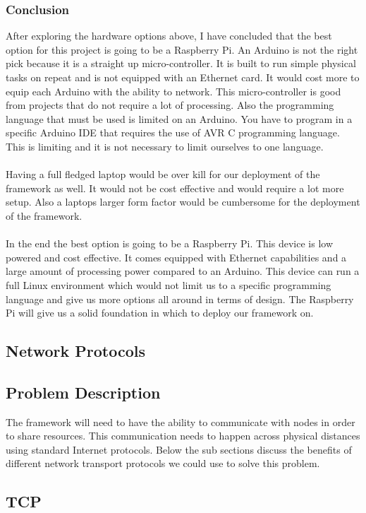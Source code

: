 \documentclass[draftclsnofoot, onecolumn, compsoc, 10pt]{IEEEtran}
\begin{document}
\subsubsection{Conclusion}
After exploring the hardware options above, I have concluded that the best option for this project is going to be a Raspberry Pi. An Arduino is not the right pick because it is a straight up micro-controller. It is built to run simple physical tasks on repeat and is not equipped with an Ethernet card. It would cost more to equip each Arduino with the ability to network. This micro-controller is good from projects that do not require a lot of processing. Also the programming language that must be used is limited on an Arduino. You have to program in a specific Arduino IDE that requires the use of AVR C programming language. This is limiting and it is not necessary to limit ourselves to one language.
\\ \\
Having a full fledged laptop would be over kill for our deployment of the framework as well. It would not be cost effective and would require a lot more setup. Also a laptops larger form factor would be cumbersome for the deployment of the framework.
\\ \\
In the end the best option is going to be a Raspberry Pi. This device is low powered and cost effective. It comes equipped with Ethernet capabilities and a large amount of processing power compared to an Arduino. This device can run a full Linux environment which would not limit us to a specific programming language and give us more options all around in terms of design. The Raspberry Pi will give us a solid foundation in which to deploy our framework on.


\subsection{Network Protocols}
\subsection{Problem Description}
The framework will need to have the ability to communicate with nodes in order to share resources. This communication needs to happen across physical distances using standard Internet protocols. Below the sub sections discuss the benefits of different network transport protocols we could use to solve this problem.
\subsection{TCP}
\end{document}
